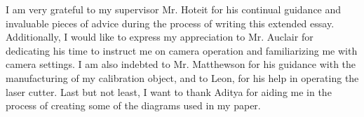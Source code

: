\documentclass[12pt, oneside]{article}
\begin{document}
I am very grateful to my supervisor Mr. Hoteit for his continual guidance and invaluable pieces of advice during the process of writing this extended essay. Additionally, I would like to express my appreciation to Mr. Auclair for dedicating his time to instruct me on camera operation and familiarizing me with camera settings. I am also indebted to Mr. Matthewson for his guidance with the manufacturing of my calibration object, and to Leon, for his help in operating the laser cutter. Last but not least, I want to thank Aditya for aiding me in the process of creating some of the diagrams used in my paper.
\clearpage
\pagestyle{backmatter}

\printbibliography[heading=bibintoc]{}


\clearpage
\begin{appendices}
    \pagestyle{appendices}
    
    
\end{appendices}
\end{document}

